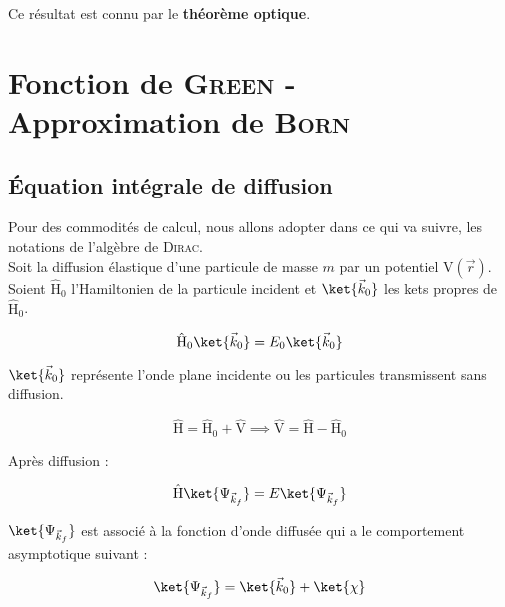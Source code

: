 \documentclass[12pt,a4paper,oneside,french]{book}
\newcommand{\opr}[1]{\mathrm{\hat{#1}}}
\theoremstyle{definition}
\theoremstyle{definition}
\theoremstyle{definition}
\theoremstyle{remark}
\theoremstyle{definition}
\begin{document}
    Ce résultat est connu par le \textbf{théorème optique}.
    
    
    
    \chapter{Fonction de \textsc{Green} - Approximation de \textsc{Born}}
    
    \section{Équation intégrale de diffusion}
    Pour des commodités de calcul, nous allons adopter dans ce qui va suivre, les notations de l'algèbre de \textsc{Dirac}. \\
    
    Soit la diffusion élastique d'une particule de masse $m$ par un potentiel $\mathrm{{V}}(\vec{{r}})$. \\
    
    Soient ${\opr{H}}_{0}$ l'Hamiltonien de la particule incident et $\ket{{\vec{k}}_{0}}$ les kets propres de ${\opr{H}}_{0}$.
    
    \begin{equation*}
        {\opr{H}}_{0} \ket{{\vec{k}}_{0}} = {E}_{0} \ket{{\vec{k}}_{0}}
    \end{equation*}
    
    $\ket{{\vec{k}}_{0}}$ représente l'onde plane incidente ou les particules transmissent sans diffusion.
    
    \begin{equation*}
        \opr{H} = {\opr{H}}_{0} + \opr{V} \implies \opr{V} = \opr{H} - {\opr{H}}_{0}
    \end{equation*}
    
    Après diffusion :
    
    \begin{equation*}
        \opr{H} \ket{{\Psi}_{{\vec{k}}_{f}}} = E \ket{{\Psi}_{{\vec{k}}_{f}}}
    \end{equation*}
    
    $\ket{{\Psi}_{{\vec{k}}_{f}}}$ est associé à la fonction d'onde diffusée qui a le comportement asymptotique suivant :
    
    \begin{equation} \label{chap3_eq/3}
        \ket{{\Psi}_{{\vec{k}}_{f}}} = \ket{{\vec{k}}_{0} \vphantom{{\Psi}_{{\vec{k}}_{f}}}} + \ket{\chi \vphantom{{\Psi}_{{\vec{k}}_{f}}}}
    \end{equation}
    
\end{document}
